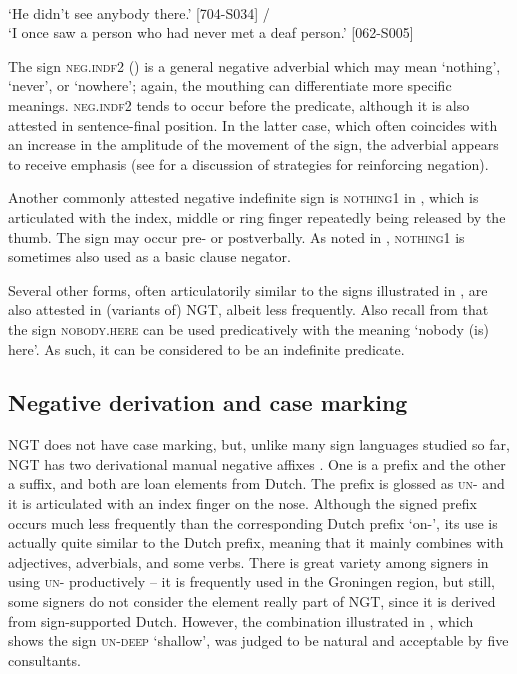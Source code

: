 \documentclass[output=paper,colorlinks,citecolor=brown]{langscibook}
\begin{document}
{\ea
    \ea\label{ex:ngt:neg.ind1-obj}  \\ `He didn't see anybody there.'  [704-S034]
    \ex\label{ex:ngt:neg.ind1-adv}  /    \\ `I once saw a person who had never met a deaf person.'  [062-S005]
    \z
\z}

The sign \textsc{neg.indf2} () is a general negative adverbial which may mean `nothing', `never', or `nowhere'; again, the mouthing can differentiate more specific meanings. \textsc{neg.indf2} tends to occur before the predicate, although it is also attested in sentence-final position. In the latter case, which often coincides with an increase in the amplitude of the movement of the sign, the adverbial appears to receive emphasis (see  for a discussion of strategies for reinforcing negation). 

Another commonly attested negative indefinite sign is \textsc{nothing1} in , which is articulated with the index, middle or ring finger repeatedly being released by the thumb. The sign may occur pre- or postverbally. As noted in , \textsc{nothing1} is sometimes also used as a basic clause negator. 

Several other forms, often articulatorily similar to the signs illustrated in , are also attested in (variants of) NGT, albeit less frequently. Also recall from  that the sign \textsc{nobody.here} can be used predicatively with the meaning `nobody (is) here'. As such, it can be considered to be an indefinite predicate.

\subsection{Negative derivation and case marking} \label{sec:ngt:derivation}

NGT does not have case marking, but, unlike many sign languages studied so far, NGT has two derivational manual negative affixes \citep{Klomp2021}. One is a prefix and the other a suffix, and both are loan elements from Dutch. 
The prefix is glossed as \textsc{un-} and it is articulated with an index finger on the nose. Although the signed prefix occurs much less frequently than the corresponding Dutch prefix `on-', its use is actually quite similar to the Dutch prefix, meaning that it mainly combines with adjectives, adverbials, and some verbs. There is great variety among signers in using \textsc{un-} productively -- it is frequently used in the Groningen region, but still, some signers do not consider the element really part of NGT, since it is derived from sign-supported Dutch. However, the combination illustrated in , which shows the sign \textsc{un-deep} `shallow', was judged to be natural and acceptable by five consultants.
\end{document}
